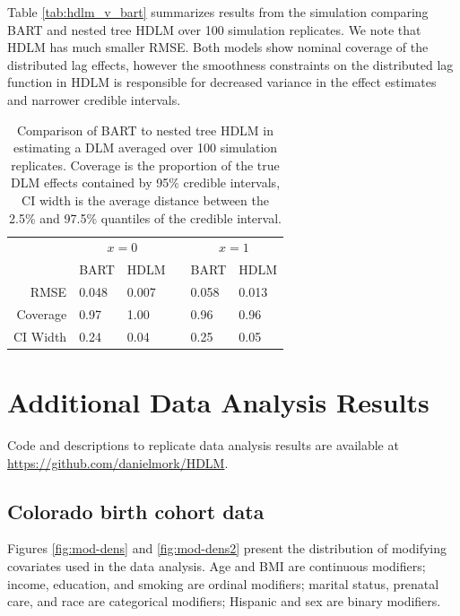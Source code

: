 \documentclass[12pt]{article}
\begin{document}
Table \ref{tab:hdlm_v_bart} summarizes results from the simulation comparing BART and nested tree HDLM over 100 simulation replicates. We note that HDLM has much smaller RMSE. Both models show nominal coverage of the distributed lag effects, however the smoothness constraints on the distributed lag function in HDLM is responsible for decreased variance in the effect estimates and narrower credible intervals.

\begin{table}[!ht]
    \caption{Comparison of BART to nested tree HDLM in estimating a DLM averaged over 100 simulation replicates. Coverage is the proportion of the true DLM effects contained by 95\% credible intervals, CI width is the average distance between the 2.5\% and 97.5\% quantiles of the credible interval.}
    \label{tab:tdlm_v_bart}
    \centering
    \begin{tabular}{rllcll}
    \toprule[2pt]
            & \multicolumn{2}{c}{$x=0$} && \multicolumn{2}{c}{$x=1$}\\
            & BART & HDLM && BART & HDLM \\
            \cmidrule{2-3}\cmidrule{5-6}
         RMSE & 0.048&0.007&&0.058&0.013\\
         Coverage & 0.97&1.00&&0.96&0.96\\
         CI Width & 0.24&0.04&&0.25&0.05\\
         \bottomrule[2pt]
    \end{tabular}
\end{table}






\clearpage
\section{Additional Data Analysis Results} 
Code and descriptions to replicate data analysis results are available at \url{https://github.com/danielmork/HDLM}.
\subsection{Colorado birth cohort data}
Figures \ref{fig:mod-dens} and \ref{fig:mod-dens2} present the distribution of modifying covariates used in the data analysis. Age and BMI are continuous modifiers; income, education, and smoking are ordinal modifiers; marital status, prenatal care, and race are categorical modifiers; Hispanic and sex are binary modifiers.
\end{document}
